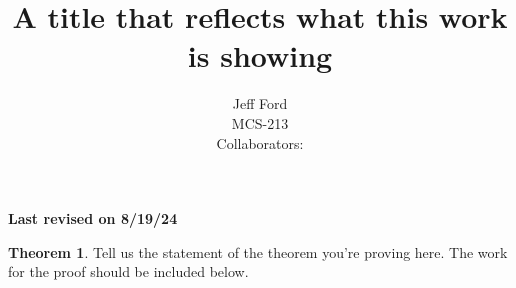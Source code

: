 \documentclass[12 pt]{article}
\theoremstyle{definition}
\newtheorem*{thm}{Theorem}
\newcommand\rev[1]{\noindent\textbf{Last revised on {#1}}\\}
\begin{document}
 
 
\title{A title that reflects what this work is showing}%
\author{Jeff Ford\\ %
MCS-213\\ %
Collaborators: } %
 
\maketitle
\rev{8/19/24} %

\begin{thm}
Tell us the statement of the theorem you're proving here. The work for the proof should be included below.
\end{thm}
\end{document}
